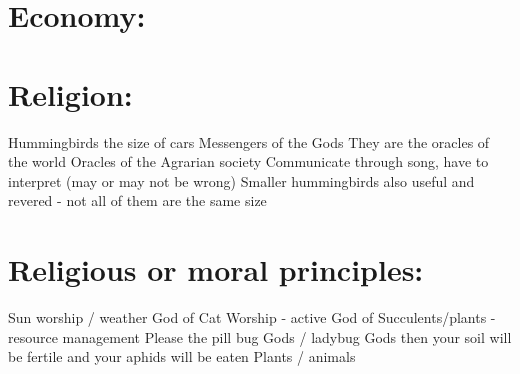 \documentclass[blue]{GL2020}
\begin{document}
 
\section{Economy:}

\section{Religion:}

Hummingbirds the size of cars
Messengers of the Gods
They are the oracles of the world
Oracles of the Agrarian society 
Communicate through song, have to interpret (may or may not be wrong)
Smaller hummingbirds also useful and revered - not all of them are the same size

\section{Religious or moral principles:}

Sun worship / weather
God of Cat Worship - active
God of Succulents/plants - resource management
Please the pill bug Gods / ladybug Gods then your soil will be fertile and your aphids will be eaten
Plants / animals
\end{document}
